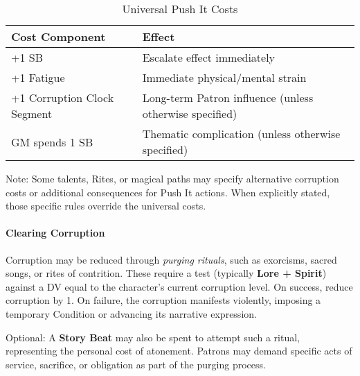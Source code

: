 \begin{table}[h]
\centering
\caption{Universal Push It Costs}
\begin{tabular}{|l|l|}
\hline
\textbf{Cost Component} & \textbf{Effect} \\ 
\hline
+1 SB & Escalate effect immediately \\ 
+1 Fatigue & Immediate physical/mental strain \\ 
+1 Corruption Clock Segment & Long-term Patron influence (unless otherwise specified) \\ 
GM spends 1 SB & Thematic complication (unless otherwise specified) \\ 
\hline
\end{tabular}
\end{table}

Note: Some talents, Rites, or magical paths may specify alternative corruption costs or additional consequences for Push It actions. When explicitly stated, those specific rules override the universal costs.

\paragraph{Clearing Corruption}
Corruption may be reduced through \textit{purging rituals}, such as exorcisms, sacred songs, or rites of contrition. 
These require a test (typically \textbf{Lore + Spirit}) against a DV equal to the character’s current corruption level.  
On success, reduce corruption by 1. On failure, the corruption manifests violently, imposing a temporary Condition or advancing its narrative expression.  

Optional: A \textbf{Story Beat} may also be spent to attempt such a ritual, representing the personal cost of atonement. Patrons may demand specific acts of service, sacrifice, or obligation as part of the purging process.

\newcommand{\PatronGift}[2]{%
\paragraph{Patron's Gift (Imbuement).}
\textbf{Cost: Free, requires a Thaisos}

Once per scene as an action (cost: 1 Boon; requires \textbf{Thiasos}), touch an item to imbue it until scene end with \textbf{+1 Melee} and \textbf{+1 #1}. \emph{Push It:} extend one more scene by marking \textbf{+1 Obligation}. Gifts from the same Patron don’t stack; take the best. Dice bonuses respect the +3 cap. \textit{Domain:} #2.
}

